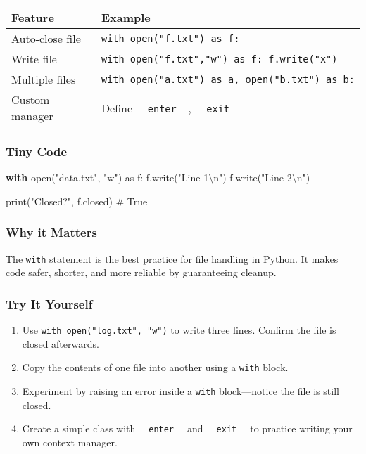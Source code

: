 \documentclass[
  letterpaper,
  DIV=11,
  numbers=noendperiod]{scrreprt}
\newenvironment{Shaded}{\begin{snugshade}}{\end{snugshade}}
\newcommand{\BuiltInTok}[1]{\textcolor[rgb]{0.00,0.23,0.31}{#1}}
\newcommand{\CharTok}[1]{\textcolor[rgb]{0.13,0.47,0.30}{#1}}
\newcommand{\CommentTok}[1]{\textcolor[rgb]{0.37,0.37,0.37}{#1}}
\newcommand{\ControlFlowTok}[1]{\textcolor[rgb]{0.00,0.23,0.31}{\textbf{#1}}}
\newcommand{\ImportTok}[1]{\textcolor[rgb]{0.00,0.46,0.62}{#1}}
\newcommand{\NormalTok}[1]{\textcolor[rgb]{0.00,0.23,0.31}{#1}}
\newcommand{\StringTok}[1]{\textcolor[rgb]{0.13,0.47,0.30}{#1}}
\providecommand{\tightlist}{%
  \setlength{\itemsep}{0pt}\setlength{\parskip}{0pt}}
\begin{document}
\begin{longtable}[]{@{}ll@{}}
\toprule\noalign{}
Feature & Example \\
\midrule\noalign{}
\endhead
\bottomrule\noalign{}
\endlastfoot
Auto-close file & \texttt{with\ open("f.txt")\ as\ f:} \\
Write file & \texttt{with\ open("f.txt","w")\ as\ f:\ f.write("x")} \\
Multiple files &
\texttt{with\ open("a.txt")\ as\ a,\ open("b.txt")\ as\ b:} \\
Custom manager & Define \texttt{\_\_enter\_\_}, \texttt{\_\_exit\_\_} \\
\end{longtable}

\subsubsection{Tiny Code}\label{tiny-code-55}

\begin{Shaded}
\begin{Highlighting}[]
\ControlFlowTok{with} \BuiltInTok{open}\NormalTok{(}\StringTok{"data.txt"}\NormalTok{, }\StringTok{"w"}\NormalTok{) }\ImportTok{as}\NormalTok{ f:}
\NormalTok{    f.write(}\StringTok{"Line 1}\CharTok{\textbackslash{}n}\StringTok{"}\NormalTok{)}
\NormalTok{    f.write(}\StringTok{"Line 2}\CharTok{\textbackslash{}n}\StringTok{"}\NormalTok{)}

\BuiltInTok{print}\NormalTok{(}\StringTok{"Closed?"}\NormalTok{, f.closed)  }\CommentTok{\# True}
\end{Highlighting}
\end{Shaded}

\subsubsection{Why it Matters}\label{why-it-matters-55}

The \texttt{with} statement is the best practice for file handling in
Python. It makes code safer, shorter, and more reliable by guaranteeing
cleanup.

\subsubsection{Try It Yourself}\label{try-it-yourself-55}

\begin{enumerate}
\def\labelenumi{\arabic{enumi}.}
\tightlist
\item
  Use \texttt{with\ open("log.txt",\ "w")} to write three lines. Confirm
  the file is closed afterwards.
\item
  Copy the contents of one file into another using a \texttt{with}
  block.
\item
  Experiment by raising an error inside a \texttt{with} block---notice
  the file is still closed.
\item
  Create a simple class with \texttt{\_\_enter\_\_} and
  \texttt{\_\_exit\_\_} to practice writing your own context manager.
\end{enumerate}
\end{document}
